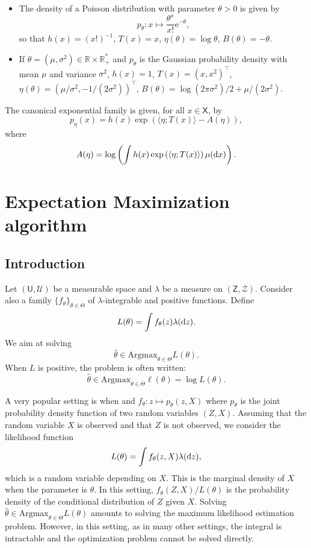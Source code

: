 \documentclass[english,graybox,envcountchap,envcountsame,sectrefs,shortlabels]{svmono}
\theoremstyle{style}
\newcommand{\Zset}{\mathsf{Z}}
\newcommand{\Zsigma}{\mathcal{Z}}
\newcommand{\rme}{\mathrm{e}}
\newcommand{\eqsp}{}
\newcommand{\Xset}{\mathsf{X}}
\newcommand{\Uset}{\mathsf{U}}
\newcommand{\Usigma}{\mathcal{U}}
\begin{document}
\begin{example}
\begin{itemize}
\item The density of a Poisson distribution with parameter $\theta>0$ is given by
$$
p_\theta:x \mapsto \frac{\theta^x}{x!} \rme^{-\theta}\eqsp,
$$
so that $h(x) = (x!)^{-1}$, $T(x)=x$, $\eta(\theta) = \log \theta$, $B(\theta) = -\theta$.
\item If $\theta = (\mu,\sigma^2)\in\mathbb{R}\times\mathbb{R}_+^*$ and $p_\theta$ is the Gaussian probability density with mean $\mu$ and variance $\sigma^2$, $h(x) = 1$, $T(x)=(x,x^2)^\top$, $\eta(\theta) = (\mu/\sigma^2,-1/(2\sigma^2))^\top$, $B(\theta) = \log(2\pi\sigma^2)/2 + \mu/(2\sigma^2)$.
\end{itemize}
\end{example}
The canonical exponential family is given, for all $x\in\Xset$, by 
$$
p_\eta(x) = h(x)\exp\left(\langle \eta;T(x)\rangle - A(\eta)\right)\eqsp,
$$
where
$$
A(\eta) = \log\left(\int h(x)\exp\left(\langle \eta;T(x)\rangle \right)\mu(\rmd x)\right)\eqsp.
$$

\chapter{Expectation Maximization algorithm}

\section{Introduction}
Let $(\Uset,\Usigma)$ be a measurable space and $\lambda$ be a measure on $(\Zset,\Zsigma)$. Consider also a family $\{f_\theta\}_{\theta\in\Theta}$ of $\lambda$-integrable and positive functions. Define
$$
L(\theta) = \int f_\theta(z)\lambda(\rmd z)\eqsp.
$$
We aim at solving
$$
\widehat \theta \in\mathrm{Argmax}_{\theta\in\Theta} L(\theta)\eqsp.
$$
When $L$ is positive, the problem is often written:
$$
\widehat \theta \in\mathrm{Argmax}_{\theta\in\Theta} \ell(\theta) = \log L(\theta)\eqsp.
$$

\begin{example}
\label{ex:EM}
A very popular setting is when  and $f_\theta: z \mapsto p_\theta(z,X)$ where $p_\theta$ is the joint probability density function of two random variables $(Z,X)$. Assuming that the random variable $X$ is observed and that $Z$ is not observed, we consider the likelihood function
$$
L(\theta) = \int f_\theta(z,X)\lambda(\rmd z)\eqsp,
$$
which is a random variable depending on $X$. This is the marginal density of $X$ when the parameter is $\theta$. In this setting, $f_\theta(Z,X)/L(\theta)$ is the probability density of the conditional distribution of $Z$ given $X$.  Solving $\widehat \theta \in\mathrm{Argmax}_{\theta\in\Theta} L(\theta)$ amounts to solving the maximum likelihood estimation problem. However, in this setting, as in many other settings, the integral is intractable and the optimization problem cannot be solved directly.
\end{example}
\end{document}
